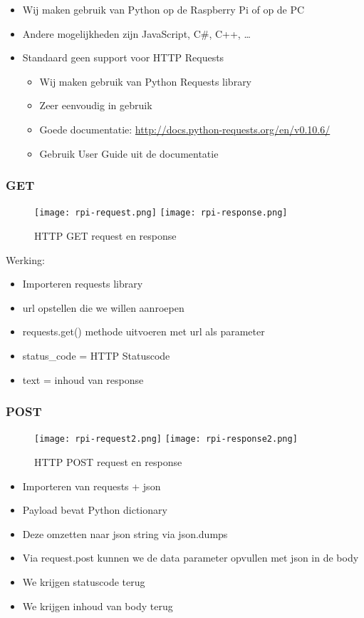 \documentclass{article}
\begin{document}
\begin{itemize}
    \item Wij maken gebruik van Python op de Raspberry Pi of op de PC
    \item Andere mogelijkheden zijn JavaScript, C\#, C++, \dots
    \item Standaard geen support voor HTTP Requests
    \begin{itemize}
        \item Wij maken gebruik van Python Requests library
        \item Zeer eenvoudig in gebruik
        \item Goede documentatie: \url{http://docs.python-requests.org/en/v0.10.6/}
        \item Gebruik User Guide uit de documentatie
    \end{itemize}
\end{itemize}

\subsubsection{GET}

\begin{figure}[H]
    \centering
    \texttt{[image: rpi-request.png]}
    \texttt{[image: rpi-response.png]}
    \caption{HTTP GET request en response}
\end{figure}

Werking: 
\begin{itemize}
    \item Importeren requests library
    \item url opstellen die we willen aanroepen
    \item requests.get() methode uitvoeren met url als parameter
    \item status\_code = HTTP Statuscode
    \item text = inhoud van response
\end{itemize}

\subsubsection{POST}

\begin{figure}[H]
    \centering
    \texttt{[image: rpi-request2.png]}
    \texttt{[image: rpi-response2.png]}
    \caption{HTTP POST request en response}
\end{figure}

\begin{itemize}
    \item Importeren van requests + json
    \item Payload bevat Python dictionary
    \item Deze omzetten naar json string via json.dumps
    \item Via request.post kunnen we de data parameter opvullen met json in de body
    \item We krijgen statuscode terug
    \item We krijgen inhoud van body terug
\end{itemize}
\end{document}
